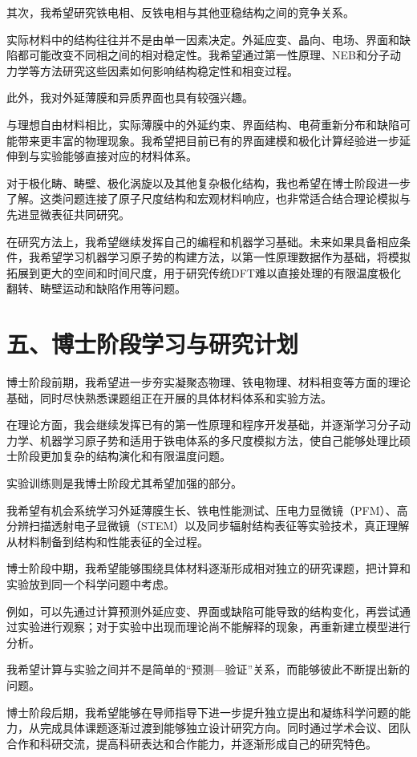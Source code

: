其次，我希望研究铁电相、反铁电相与其他亚稳结构之间的竞争关系。

实际材料中的结构往往并不是由单一因素决定。外延应变、晶向、电场、界面和缺陷都可能改变不同相之间的相对稳定性。我希望通过第一性原理、NEB和分子动力学等方法研究这些因素如何影响结构稳定性和相变过程。

此外，我对外延薄膜和异质界面也具有较强兴趣。

与理想自由材料相比，实际薄膜中的外延约束、界面结构、电荷重新分布和缺陷可能带来更丰富的物理现象。我希望把目前已有的界面建模和极化计算经验进一步延伸到与实验能够直接对应的材料体系。

对于极化畴、畴壁、极化涡旋以及其他复杂极化结构，我也希望在博士阶段进一步了解。这类问题连接了原子尺度结构和宏观材料响应，也非常适合结合理论模拟与先进显微表征共同研究。

在研究方法上，我希望继续发挥自己的编程和机器学习基础。未来如果具备相应条件，我希望学习机器学习原子势的构建方法，以第一性原理数据作为基础，将模拟拓展到更大的空间和时间尺度，用于研究传统DFT难以直接处理的有限温度极化翻转、畴壁运动和缺陷作用等问题。

\section{五、博士阶段学习与研究计划}

博士阶段前期，我希望进一步夯实凝聚态物理、铁电物理、材料相变等方面的理论基础，同时尽快熟悉课题组正在开展的具体材料体系和实验方法。

在理论方面，我会继续发挥已有的第一性原理和程序开发基础，并逐渐学习分子动力学、机器学习原子势和适用于铁电体系的多尺度模拟方法，使自己能够处理比硕士阶段更加复杂的结构演化和有限温度问题。

实验训练则是我博士阶段尤其希望加强的部分。

我希望有机会系统学习外延薄膜生长、铁电性能测试、压电力显微镜（PFM）、高分辨扫描透射电子显微镜（STEM）以及同步辐射结构表征等实验技术，真正理解从材料制备到结构和性能表征的全过程。

博士阶段中期，我希望能够围绕具体材料逐渐形成相对独立的研究课题，把计算和实验放到同一个科学问题中考虑。

例如，可以先通过计算预测外延应变、界面或缺陷可能导致的结构变化，再尝试通过实验进行观察；对于实验中出现而理论尚不能解释的现象，再重新建立模型进行分析。

我希望计算与实验之间并不是简单的“预测—验证”关系，而能够彼此不断提出新的问题。

博士阶段后期，我希望能够在导师指导下进一步提升独立提出和凝练科学问题的能力，从完成具体课题逐渐过渡到能够独立设计研究方向。同时通过学术会议、团队合作和科研交流，提高科研表达和合作能力，并逐渐形成自己的研究特色。

